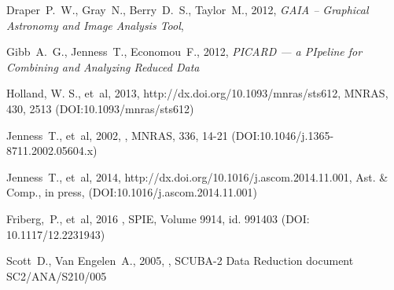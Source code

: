 \documentclass[11pt,oneside,chapters]{starlink}
\begin{document}
\begin{thebibliography}{}
Draper~P.~W., Gray~N., Berry~D.~S., Taylor~M., 2012,
\textit{GAIA -- Graphical Astronomy and Image Analysis Tool},

Gibb~A.~G., Jenness~T., Economou~F., 2012, \textit{PICARD --- a
PIpeline for Combining and Analyzing Reduced Data}

Holland, W. S., et~al, 2013, 
{http://dx.doi.org/10.1093/mnras/sts612}, MNRAS, 430, 2513
(DOI:10.1093/mnras/sts612)

Jenness~T., et~al, 2002, ,
MNRAS, 336, 14-21 (DOI:10.1046/j.1365-8711.2002.05604.x)

Jenness~T., et~al, 2014,
 {http://dx.doi.org/10.1016/j.ascom.2014.11.001},
Ast. \& Comp., in press, (DOI:10.1016/j.ascom.2014.11.001)

Friberg,~P., et~al, 2016 ,
SPIE, Volume 9914, id. 991403
(DOI: 10.1117/12.2231943)

Scott~D., Van Engelen~A., 2005, ,
SCUBA-2 Data Reduction document SC2/ANA/S210/005

\end{thebibliography}

\newpage
\appendix

\end{document}
